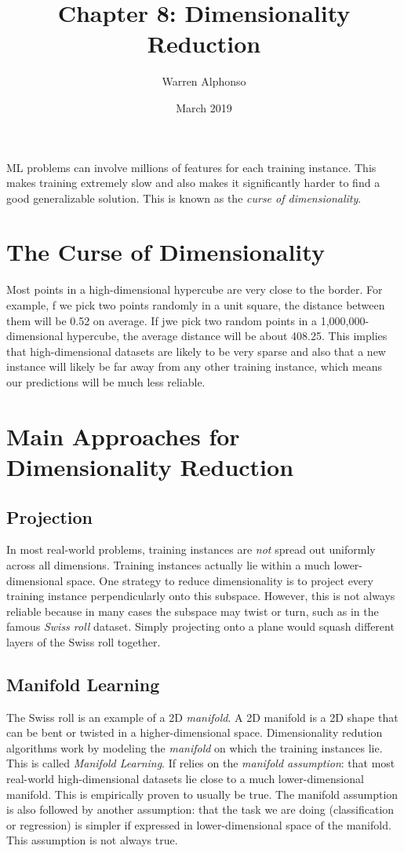 \documentclass[letterpaper]{article}
\title{Chapter 8: Dimensionality Reduction}
\author{Warren Alphonso}
\date{March 2019}
\begin{document}
\maketitle

ML problems can involve millions of features for each training instance. This makes training extremely slow and also makes it significantly harder to find a good generalizable solution. This is known as the \textsl{curse of dimensionality}. 

\section{The Curse of Dimensionality} 
Most points in a high-dimensional hypercube are very close to the border. For example, f we pick two points randomly in a unit square, the distance between them will be 0.52 on average. If jwe pick two random points in a 1,000,000-dimensional hypercube, the average distance will be about 408.25. This implies that high-dimensional datasets are likely to be very sparse and also that a new instance will likely be far away from any other training instance, which means our predictions will be much less reliable. 

\section{Main Approaches for Dimensionality Reduction} 
\subsection{Projection} 
In most real-world problems, training instances are \textsl{not} spread out uniformly across all dimensions. Training instances actually lie within a much lower-dimensional space. One strategy to reduce dimensionality is to project every training instance perpendicularly onto this subspace. However, this is not always reliable because in many cases the subspace may twist or turn, such as in the famous \textsl{Swiss roll} dataset. Simply projecting onto a plane would squash different layers of the Swiss roll together. 

\subsection{Manifold Learning} 
The Swiss roll is an example of a 2D \textsl{manifold}. A 2D manifold is a 2D shape that can be bent or twisted in a higher-dimensional space. Dimensionality redution algorithms work by modeling the \textsl{manifold} on which the training instances lie. This is called \textsl{Manifold Learning}. If relies on the \textsl{manifold assumption}: that most real-world high-dimensional datasets lie close to a much lower-dimensional manifold. This is empirically proven to usually be true. The manifold assumption is also followed by another assumption: that the task we are doing (classification or regression) is simpler if expressed in lower-dimensional space of the manifold. This assumption is not always true. 
\end{document}
